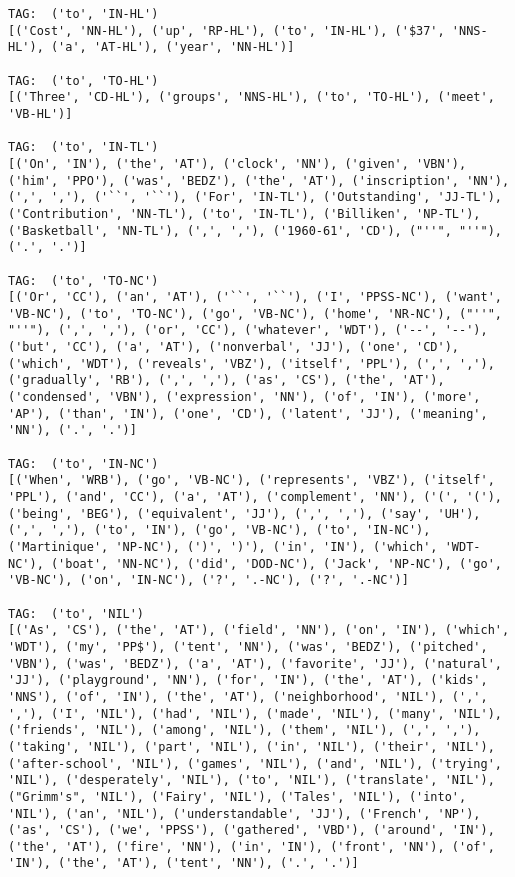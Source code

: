 \documentclass[11pt]{article}
\begin{document}
\begin{enumerate}
\begin{lstlisting}
TAG:  ('to', 'IN-HL')
[('Cost', 'NN-HL'), ('up', 'RP-HL'), ('to', 'IN-HL'), ('$37', 'NNS-HL'), ('a', 'AT-HL'), ('year', 'NN-HL')]

TAG:  ('to', 'TO-HL')
[('Three', 'CD-HL'), ('groups', 'NNS-HL'), ('to', 'TO-HL'), ('meet', 'VB-HL')]

TAG:  ('to', 'IN-TL')
[('On', 'IN'), ('the', 'AT'), ('clock', 'NN'), ('given', 'VBN'), ('him', 'PPO'), ('was', 'BEDZ'), ('the', 'AT'), ('inscription', 'NN'), (',', ','), ('``', '``'), ('For', 'IN-TL'), ('Outstanding', 'JJ-TL'), ('Contribution', 'NN-TL'), ('to', 'IN-TL'), ('Billiken', 'NP-TL'), ('Basketball', 'NN-TL'), (',', ','), ('1960-61', 'CD'), ("''", "''"), ('.', '.')]

TAG:  ('to', 'TO-NC')
[('Or', 'CC'), ('an', 'AT'), ('``', '``'), ('I', 'PPSS-NC'), ('want', 'VB-NC'), ('to', 'TO-NC'), ('go', 'VB-NC'), ('home', 'NR-NC'), ("''", "''"), (',', ','), ('or', 'CC'), ('whatever', 'WDT'), ('--', '--'), ('but', 'CC'), ('a', 'AT'), ('nonverbal', 'JJ'), ('one', 'CD'), ('which', 'WDT'), ('reveals', 'VBZ'), ('itself', 'PPL'), (',', ','), ('gradually', 'RB'), (',', ','), ('as', 'CS'), ('the', 'AT'), ('condensed', 'VBN'), ('expression', 'NN'), ('of', 'IN'), ('more', 'AP'), ('than', 'IN'), ('one', 'CD'), ('latent', 'JJ'), ('meaning', 'NN'), ('.', '.')]

TAG:  ('to', 'IN-NC')
[('When', 'WRB'), ('go', 'VB-NC'), ('represents', 'VBZ'), ('itself', 'PPL'), ('and', 'CC'), ('a', 'AT'), ('complement', 'NN'), ('(', '('), ('being', 'BEG'), ('equivalent', 'JJ'), (',', ','), ('say', 'UH'), (',', ','), ('to', 'IN'), ('go', 'VB-NC'), ('to', 'IN-NC'), ('Martinique', 'NP-NC'), (')', ')'), ('in', 'IN'), ('which', 'WDT-NC'), ('boat', 'NN-NC'), ('did', 'DOD-NC'), ('Jack', 'NP-NC'), ('go', 'VB-NC'), ('on', 'IN-NC'), ('?', '.-NC'), ('?', '.-NC')]

TAG:  ('to', 'NIL')
[('As', 'CS'), ('the', 'AT'), ('field', 'NN'), ('on', 'IN'), ('which', 'WDT'), ('my', 'PP$'), ('tent', 'NN'), ('was', 'BEDZ'), ('pitched', 'VBN'), ('was', 'BEDZ'), ('a', 'AT'), ('favorite', 'JJ'), ('natural', 'JJ'), ('playground', 'NN'), ('for', 'IN'), ('the', 'AT'), ('kids', 'NNS'), ('of', 'IN'), ('the', 'AT'), ('neighborhood', 'NIL'), (',', ','), ('I', 'NIL'), ('had', 'NIL'), ('made', 'NIL'), ('many', 'NIL'), ('friends', 'NIL'), ('among', 'NIL'), ('them', 'NIL'), (',', ','), ('taking', 'NIL'), ('part', 'NIL'), ('in', 'NIL'), ('their', 'NIL'), ('after-school', 'NIL'), ('games', 'NIL'), ('and', 'NIL'), ('trying', 'NIL'), ('desperately', 'NIL'), ('to', 'NIL'), ('translate', 'NIL'), ("Grimm's", 'NIL'), ('Fairy', 'NIL'), ('Tales', 'NIL'), ('into', 'NIL'), ('an', 'NIL'), ('understandable', 'JJ'), ('French', 'NP'), ('as', 'CS'), ('we', 'PPSS'), ('gathered', 'VBD'), ('around', 'IN'), ('the', 'AT'), ('fire', 'NN'), ('in', 'IN'), ('front', 'NN'), ('of', 'IN'), ('the', 'AT'), ('tent', 'NN'), ('.', '.')]


\end{lstlisting}
\end{enumerate}
\end{document}
